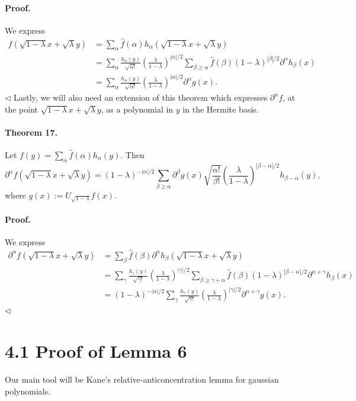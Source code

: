 \documentclass[10pt,a4paper]{article}
\begin{document}
\paragraph{Proof.} We express
\begin{align*}
f(\sqrt{1-\lambda}x+\sqrt\lambda y)&=\sum_\alpha\widehat f(\alpha)h_\alpha(\sqrt{1-\lambda}x+\sqrt\lambda y)\\
&=\sum_\alpha\frac{h_\alpha(y)}{\sqrt{\alpha!}}\left(\frac\lambda{1-\lambda}\right)^{|\alpha|/2}\sum_{\beta\geq\alpha}\widehat f(\beta)(1-\lambda)^{|\beta|/2}\partial^\alpha h_\beta(x)\\
&=\sum_\alpha\frac{h_\alpha(y)}{\sqrt{\alpha!}}\left(\frac\lambda{1-\lambda}\right)^{|\alpha|/2}\partial^\alpha g(x).
\end{align*}\hfill$\triangleleft$
Lastly, we will also need an extension of this theorem which expresses $\partial^\alpha f$, at the point $\sqrt{1-\lambda}x+\sqrt\lambda y$, as a polynomial in $y$ in the Hermite basis.
\paragraph{Theorem 17.} Let $f(y)=\sum_\alpha\widehat f(\alpha)h_\alpha(y)$. Then
\[\partial^\alpha f(\sqrt{1-\lambda}x+\sqrt\lambda y)=(1-\lambda)^{-|\alpha|/2}\sum_{\beta\geq\alpha}\partial^\beta g(x)\sqrt{\frac{\alpha!}{\beta!}}\left(\frac\lambda{1-\lambda}\right)^{|\beta-\alpha|/2}h_{\beta-\alpha}(y),\]
where $g(x):=U_{\sqrt{1-\lambda}}f(x)$.
\paragraph{Proof.} We express
\begin{align*}
\partial^\alpha f(\sqrt{1-\lambda}x+\sqrt\lambda y)&=\sum_\beta\widehat f(\beta)\partial^\alpha h_\beta(\sqrt{1-\lambda}x+\sqrt\lambda y)\\
&=\sum_\gamma\frac{h_\gamma(y)}{\sqrt{\gamma!}}\left(\frac\lambda{1-\lambda}\right)^{|\gamma|/2}\sum_{\beta\geq\gamma+\alpha}\widehat f(\beta)(1-\lambda)^{|\beta-\alpha|/2}\partial^{\alpha+\gamma}h_\beta(x)\\
&=(1-\lambda)^{-|\alpha|/2}\sum_\gamma\frac{h_\gamma(y)}{\sqrt{\gamma!}}\left(\frac\lambda{1-\lambda}\right)^{|\gamma|/2}\partial^{\alpha+\gamma}g(x).
\end{align*}\hfill$\triangleleft$

\section*{4.1 Proof of Lemma 6}
Our main tool will be Kane's relative-anticoncentration lemma for gaussian polynomials.
\end{document}
